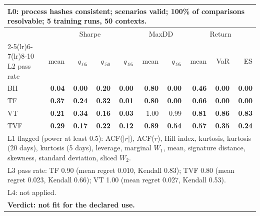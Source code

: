 \begin{tabular}{lrrrrrrrrr}
\toprule
\multicolumn{10}{p{13.5cm}}{L0: process hashes consistent; scenarios valid; 100\% of comparisons resolvable; 5 training runs, 50 contexts.} \\
\midrule
 & \multicolumn{4}{c}{Sharpe} & \multicolumn{2}{c}{MaxDD} & \multicolumn{3}{c}{Return} \\
\cmidrule(lr){2-5}\cmidrule(lr){6-7}\cmidrule(lr){8-10}
L2 pass rate & mean & $q_{.05}$ & $q_{.50}$ & $q_{.95}$ & mean & $q_{.95}$ & mean & VaR & ES \\
\midrule
BH & \textbf{0.04} & \textbf{0.00} & \textbf{0.20} & \textbf{0.00} & \textbf{0.80} & \textbf{0.00} & \textbf{0.46} & \textbf{0.00} & \textbf{0.00} \\
TF & \textbf{0.37} & \textbf{0.24} & \textbf{0.32} & \textbf{0.01} & \textbf{0.80} & \textbf{0.00} & \textbf{0.66} & \textbf{0.00} & \textbf{0.00} \\
VT & \textbf{0.21} & \textbf{0.34} & \textbf{0.16} & \textbf{0.03} & 1.00 & 0.99 & \textbf{0.81} & \textbf{0.86} & \textbf{0.83} \\
TVF & \textbf{0.29} & \textbf{0.17} & \textbf{0.22} & \textbf{0.12} & \textbf{0.89} & \textbf{0.54} & \textbf{0.57} & \textbf{0.35} & \textbf{0.24} \\
\midrule
\multicolumn{10}{p{13.5cm}}{L1 flagged (power at least 0.5): ACF($|r|$), ACF($r$), Hill index, kurtosis, kurtosis (20 days), kurtosis (5 days), leverage, marginal $W_1$, mean, signature distance, skewness, standard deviation, sliced $W_2$.} \\
\multicolumn{10}{p{13.5cm}}{L3 pass rate: TF 0.90 (mean regret 0.010, Kendall 0.83); TVF 0.80 (mean regret 0.023, Kendall 0.66); VT 1.00 (mean regret 0.027, Kendall 0.53).} \\
\multicolumn{10}{p{13.5cm}}{L4: not applied.} \\
\multicolumn{10}{p{13.5cm}}{\textbf{Verdict: not fit for the declared use.}} \\
\bottomrule
\end{tabular}
